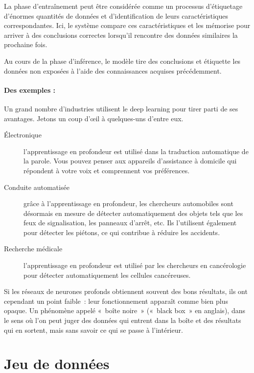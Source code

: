 \documentclass[oneside,13pt,a4paper]{report}
\begin{document}
La phase d'entraînement peut être considérée comme un processus d'étiquetage d'énormes quantités de données et d'identification de leurs caractéristiques correspondantes. Ici, le système compare ces caractéristiques et les mémorise pour arriver à des conclusions correctes lorsqu'il rencontre des données similaires la prochaine fois.

Au cours de la phase d'inférence, le modèle tire des conclusions et étiquette les données non exposées à l'aide des connaissances acquises précédemment.

\paragraph{Des exemples : }

Un grand nombre d'industries utilisent le deep learning pour tirer parti de ses avantages. Jetons un coup d'œil à quelques-uns d'entre eux.

\begin{description}
	\item[Électronique] l'apprentissage en profondeur est utilisé dans la traduction automatique de la parole. Vous pouvez penser aux appareils d'assistance à domicile qui répondent à votre voix et comprennent vos préférences.
	\item[Conduite automatisée] grâce à l'apprentissage en profondeur, les chercheurs automobiles sont désormais en mesure de détecter automatiquement des objets tels que les feux de signalisation, les panneaux d'arrêt, etc. Ils l'utilisent également pour détecter les piétons, ce qui contribue à réduire les accidents.
	\item[Recherche médicale] l'apprentissage en profondeur est utilisé par les chercheurs en cancérologie pour détecter automatiquement les cellules cancéreuses.
\end{description}

Si les réseaux de neurones profonds obtiennent souvent des bons résultats, ils ont cependant un point faible : leur fonctionnement apparaît comme bien plus opaque. Un phénomène appelé « boîte noire » (« black box » en anglais), dans le sens où l'on peut juger des données qui entrent dans la boîte et des résultats qui en sortent, mais sans savoir ce qui se passe à l'intérieur.

\section{Jeu de données}
\end{document}
